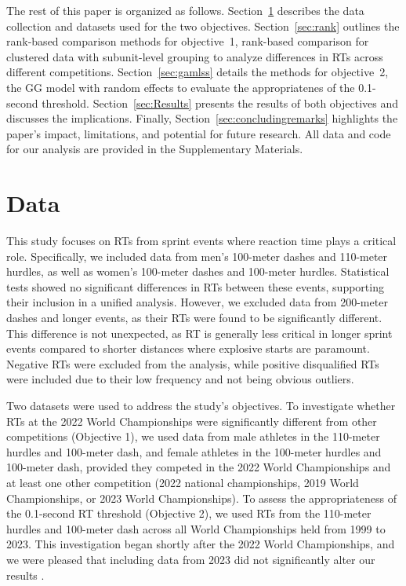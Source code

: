 \documentclass[12pt, letterpaper]{article}
\begin{document}
The rest of this paper is organized as follows. Section~\ref{sec:Data}
describes the data collection and datasets used for the two
objectives. Section~\ref{sec:rank} outlines the rank-based comparison
methods for objective~1, rank-based comparison for clustered data with
subunit-level grouping to analyze differences in RTs across different
competitions. Section~\ref{sec:gamlss} details the methods for
objective~2, the GG model with random effects to evaluate the appropriatenes
of the 0.1-second threshold. Section~\ref{sec:Results} presents the
results of both objectives and discusses the implications.
Finally, Section~\ref{sec:concludingremarks} highlights the
paper’s impact, limitations, and potential for future research.
All data and code for our analysis are provided in the Supplementary
Materials.



\section{Data}
\label{sec:Data}


This study focuses on RTs from sprint events where reaction
time plays a critical role. Specifically, we included data from men’s
100-meter dashes and 110-meter hurdles, as well as women’s 100-meter
dashes and 100-meter hurdles. Statistical tests showed no significant
differences in RTs between these events, supporting their
inclusion in a unified analysis. However, we excluded data from
200-meter dashes and longer events, as their RTs were found
to be significantly different. This difference is not unexpected, as
RT is generally less critical in longer sprint events
compared to shorter distances where explosive starts are paramount.
Negative RTs were excluded from the analysis, while positive
disqualified RTs were included due to their low frequency and not
being obvious outliers. %


Two datasets were used to address the study's objectives. To
investigate whether RTs at the 2022 World Championships
were significantly different from other competitions (Objective 1), we
used data from male athletes in the 110-meter hurdles and 100-meter
dash, and female athletes in the 100-meter hurdles and 100-meter dash,
provided they competed in the 2022 World Championships and at least
one other competition (2022 national championships, 2019 World
Championships, or 2023 World Championships). To assess the
appropriateness of the 0.1-second RT threshold (Objective
2), we used RTs from the 110-meter hurdles and 100-meter
dash across all World Championships held from 1999 to 2023. This
investigation began shortly after the 2022 World Championships, and we
were pleased that including data from 2023 did not significantly
alter our results \citep{WAData}.
\end{document}
